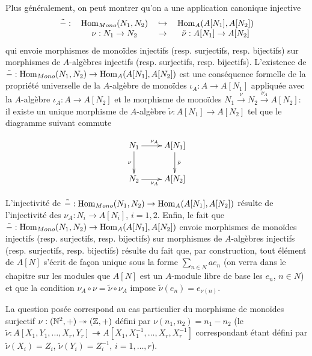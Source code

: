 \begin{correction}
    Plus généralement, on peut montrer qu'on a une application canonique injective
    \[\begin{tabular}[t]{cccc}
        $\tilde{-}:$&$ \SHom_{Mono}(N_1,N_2)$&$\hookrightarrow$&$
        \SHom_{A}(A[N_1], A[N_2])$ \\
        &$\nu:N_1\rightarrow N_2$&$\rightarrow$&$\tilde{\nu}:A[N_1]\rightarrow
        A[N_2]$
    \end{tabular}\]
    qui envoie morphismes de monoïdes injectifs (resp. surjectifs, resp.
    bijectifs) sur morphismes de $A$-algèbres injectifs (resp. surjectifs,
    resp. bijectifs). L'existence de $\tilde{-}: \operatorname{Hom}_{Mono}(N_1,N_2)
    \rightarrow  \operatorname{Hom}_{A}(A[N_1], A[N_2])$ est une conséquence formelle de la
    propriété universelle de la $A$-algèbre de monoïdes $\iota_A:A\rightarrow
    A[N_1]$ appliquée  avec la $A$-algèbre   $\iota_A:A\rightarrow A[N_2]$ et
    le morphisme de monoïdes $ N_1\stackrel{\nu}{\rightarrow}
    N_2\stackrel{\nu_A}{\rightarrow} A[N_2]$: il existe un unique morphisme de
    $A$-algèbre $\tilde{\nu}:A[N_1]\rightarrow A[N_2]$ tel que le diagramme
    suivant commute

    \[\xymatrix{N_1\ar[r]^{\nu_A}\ar[d]_\nu&A[N_1]\ar[d]^{\tilde{\nu}}\\
    N_2\ar[r]_{\nu_A}  &A[N_2]}\]

    L'injectivité de $\tilde{-}: \operatorname{Hom}_{Mono}(N_1,N_2) \rightarrow
    \operatorname{Hom}_{A}(A[N_1], A[N_2])$ résulte de l'injectivité des
    $\nu_A:N_i\rightarrow A[N_i]$, $i=1,2$. Enfin, le fait que $\tilde{-}:
    \operatorname{Hom}_{Mono}(N_1,N_2) \rightarrow  \operatorname{Hom}_{A}(A[N_1], A[N_2])$ envoie
    morphismes de monoïdes injectifs (resp. surjectifs, resp. bijectifs) sur
    morphismes de $A$-algèbres injectifs (resp. surjectifs, resp. bijectifs)
    résulte du fait que, par construction, tout élément de $A[N]$ s'écrit de
    façon unique sous la forme $\sum_{n\in N}ae_n$ (on verra dans le chapitre
    sur les modules que $A[N]$ est un $A$-module libre de base les $e_n$, $n\in
    N$) et que la condition $\nu_A\circ \nu=\tilde{\nu}\circ \nu_A$ impose
    $\tilde{\nu}(e_n)=e_{\nu(n)}$.

    La question posée correspond au cas particulier du morphisme de monoïdes
    surjectif $\nu:(\mathbb{N}^2,+)\twoheadrightarrow (\mathbb{Z},+)$ défini par
    $\nu(n_1,n_2)=n_1-n_2$ (le $\tilde{\nu}:A[X_1,Y_1,\dots,
    X_r,Y_r]\twoheadrightarrow A[X_1,X_1^{-1},\dots,X_r, X_r^{-1}]$
    correspondant étant défini par $\tilde{\nu}(X_i)=Z_i$,
    $\tilde{\nu}(Y_i)=Z_i^{-1}$, $i=1,\dots, r$).
\end{correction}

